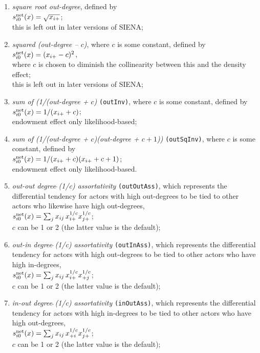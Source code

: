 \documentclass[a4paper,fleqn,11pt]{article}
\newcommand{\+}{\, + \,}
\newcommand{\vit}{\theenumi}
\newcommand{\si}{{\sf SIENA}}
\begin{document}
\begin{enumerate}
 \item {\em square root out-degree}, defined by  \\
 $s^{\rm net}_{i\vit}(x) = \sqrt{x_{i+}}$;\\
 this is left out in later versions of \si;

 \item {\em squared (out-degree -- $c$)}, where $c$ is some constant,
 defined by  \\
 $s^{\rm net}_{i\vit}(x) = (x_{i+} - c)^2$,\\
 where $c$ is chosen to diminish the collinearity between this
 and the density effect;\\
 this is left out in later versions of \si;

 \item {\em sum of (1/(out-degree + $c$)} \texttt{(outInv)},
 where $c$ is some constant,  defined by  \\
 $s^{\rm net}_{i\vit}(x) = 1/(x_{i+} + c)$;\\
 endowment effect only likelihood-based;

 \item {\em sum of (1/(out-degree + $c$)(out-degree + $c+1$))} \texttt{(outSqInv)},
 where $c$ is some constant, defined by  \\
 $s^{\rm net}_{i\vit}(x) = 1/(x_{i+} + c)(x_{i+} + c + 1)$;\\
 endowment effect only likelihood-based.

 \item {\em out-out degree$\,\hat{\ }$(1/c) assortativity}
 \texttt{(outOutAss)},
 which represents the differential tendency for actors with high out-degrees
 to be tied to other actors who likewise have high out-degrees,\\
 $s^{\rm net}_{i\vit}(x) = \sum_j x_{ij}\, {x_{i+}^{1/c}} {x_{j+}^{1/c}} $;\\
 $c$ can be 1 or 2 (the latter value is the default);

 \item {\em out-in degree$\,\hat{\ }$(1/c) assortativity}
 \texttt{(outInAss)},
 which represents the differential tendency for actors with high out-degrees
 to be tied to other actors who have high in-degrees,\\
 $s^{\rm net}_{i\vit}(x) = \sum_j x_{ij}\, {x_{i+}^{1/c}} {x_{+j}^{1/c}} $;\\
 $c$ can be 1 or 2 (the latter value is the default);

 \item {\em in-out degree$\,\hat{\ }$(1/c) assortativity}
 \texttt{(inOutAss)},
 which represents the differential tendency for actors with high in-degrees
 to be tied to other actors who have high out-degrees,\\
 $s^{\rm net}_{i\vit}(x) = \sum_j x_{ij}\, {x_{+i}^{1/c}} {x_{j+}^{1/c}} $;\\
 $c$ can be 1 or 2 (the latter value is the default);


\end{enumerate}
\end{document}
